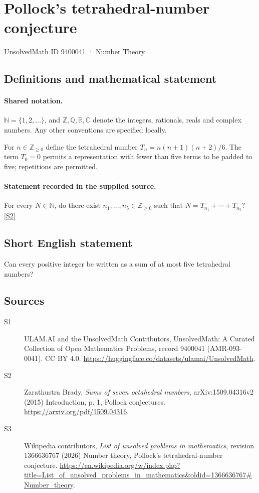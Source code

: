 \documentclass[11pt]{article}
\newcommand{\sref}[2]{\hyperlink{source:#1:#2}{[S#2]}}
\begin{document}
\setcounter{section}{9400040}
\section{Pollock's tetrahedral-number conjecture}\label{9400041}
{\small\sffamily UnsolvedMath ID 9400041 · Number Theory}
\subsection{Definitions and mathematical statement}

\paragraph{Shared notation.}$\mathbb N=\{1,2,\ldots\}$, and $\mathbb Z,\mathbb Q,\mathbb R,\mathbb C$ denote the integers, rationals, reals and complex numbers. Any other conventions are specified locally.


For $n\in\mathbb Z_{\ge0}$ define the tetrahedral number $T_n=n(n+1)(n+2)/6$. The term $T_0=0$ permits a representation with fewer than five terms to be padded to five; repetitions are permitted.
\paragraph{Statement recorded in the supplied source.}
For every $N\in\mathbb N$, do there exist $n_1,\ldots,n_5\in\mathbb Z_{\ge0}$ such that $N=T_{n_1}+\cdots+T_{n_5}$? \sref{9400041}{2}
\subsection{Short English statement}
Can every positive integer be written as a sum of at most five tetrahedral numbers?
\subsection{Sources}
\begin{description}
\item[\hypertarget{source:9400041:1}{S1}] ULAM.AI and the UnsolvedMath Contributors, UnsolvedMath: A Curated Collection of Open Mathematics Problems, record 9400041 (AMR-093-0041). CC BY 4.0. \url{https://huggingface.co/datasets/ulamai/UnsolvedMath}.
\item[\hypertarget{source:9400041:2}{S2}] Zarathustra Brady, \emph{Sums of seven octahedral numbers}, arXiv:1509.04316v2 (2015) Introduction, p. 1, Pollock conjectures. \url{https://arxiv.org/pdf/1509.04316}.
\item[\hypertarget{source:9400041:3}{S3}] Wikipedia contributors, \emph{List of unsolved problems in mathematics}, revision 1366636767 (2026) Number theory, Pollock's tetrahedral-number conjecture. \url{https://en.wikipedia.org/w/index.php?title=List_of_unsolved_problems_in_mathematics&oldid=1366636767#Number_theory}.
\end{description}
\label{end:9400041}
\end{document}
